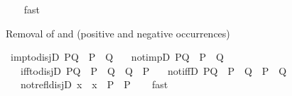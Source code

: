 \begin{isabellebody}
%
\isadelimproof
\ \ %
\endisadelimproof
%
\isatagproof
{}\isamarkupfalse%
\ fast{\isacharplus}{\kern0pt}%
\endisatagproof
{\isafoldproof}%
%
\isadelimproof
%
\endisadelimproof
%
\begin{isamarkuptext}%
Removal of \isa{{\isasymlongrightarrow}} and \isa{{\isasymlongleftrightarrow}} (positive and negative occurrences)%
\end{isamarkuptext}\isamarkuptrue%
\isamarkupfalse%
\ imp{\isacharunderscore}{\kern0pt}to{\isacharunderscore}{\kern0pt}disjD{\isacharcolon}{\kern0pt}\ {\isachardoublequoteopen}P{\isasymlongrightarrow}Q\ {\isasymLongrightarrow}\ {\isasymnot}P\ {\isasymor}\ Q{\isachardoublequoteclose}\isanewline
\ \ \ not{\isacharunderscore}{\kern0pt}impD{\isacharcolon}{\kern0pt}\ {\isachardoublequoteopen}{\isasymnot}{\isacharparenleft}{\kern0pt}P{\isasymlongrightarrow}Q{\isacharparenright}{\kern0pt}\ {\isasymLongrightarrow}\ P\ {\isasymand}\ {\isasymnot}Q{\isachardoublequoteclose}\isanewline
\ \ \ iff{\isacharunderscore}{\kern0pt}to{\isacharunderscore}{\kern0pt}disjD{\isacharcolon}{\kern0pt}\ {\isachardoublequoteopen}P{\isacharequal}{\kern0pt}Q\ {\isasymLongrightarrow}\ {\isacharparenleft}{\kern0pt}{\isasymnot}P\ {\isasymor}\ Q{\isacharparenright}{\kern0pt}\ {\isasymand}\ {\isacharparenleft}{\kern0pt}{\isasymnot}Q\ {\isasymor}\ P{\isacharparenright}{\kern0pt}{\isachardoublequoteclose}\isanewline
\ \ \ not{\isacharunderscore}{\kern0pt}iffD{\isacharcolon}{\kern0pt}\ {\isachardoublequoteopen}{\isasymnot}{\isacharparenleft}{\kern0pt}P{\isacharequal}{\kern0pt}Q{\isacharparenright}{\kern0pt}\ {\isasymLongrightarrow}\ {\isacharparenleft}{\kern0pt}P\ {\isasymor}\ Q{\isacharparenright}{\kern0pt}\ {\isasymand}\ {\isacharparenleft}{\kern0pt}{\isasymnot}P\ {\isasymor}\ {\isasymnot}Q{\isacharparenright}{\kern0pt}{\isachardoublequoteclose}\isanewline
\ \ \ \ %
\isanewline
\ \ \ not{\isacharunderscore}{\kern0pt}refl{\isacharunderscore}{\kern0pt}disj{\isacharunderscore}{\kern0pt}D{\isacharcolon}{\kern0pt}\ {\isachardoublequoteopen}x\ {\isasymnoteq}\ x\ {\isasymor}\ P\ {\isasymLongrightarrow}\ P{\isachardoublequoteclose}\isanewline
%
\isadelimproof
\ \ %
\endisadelimproof
%
\isatagproof
{}\isamarkupfalse%
\ fast{\isacharplus}{\kern0pt}%
\endisatagproof
{\isafoldproof}%
%
\isadelimproof
%
\endisadelimproof
%
\isadelimdocument
%
\endisadelimdocument
%

\end{isabellebody}
